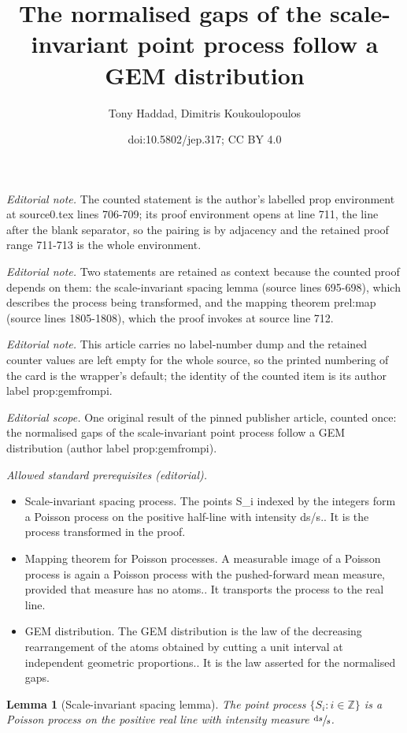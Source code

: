 \documentclass[10pt,a4paper]{article}
\title{The normalised gaps of the scale-invariant point process follow a GEM distribution}
\author{Tony Haddad, Dimitris Koukoulopoulos}
\date{doi:10.5802/jep.317; CC BY 4.0}
\newcommand{\ZZ}{\mathbb{Z}}
\theoremstyle{plain}
\newtheorem{lem}[cor]{Lemma}
\theoremstyle{definition}
\begin{document}
\maketitle
\noindent\textit{Editorial note.} The counted statement is the author's labelled prop environment at source0.tex lines 706-709; its proof environment opens at line 711, the line after the blank separator, so the pairing is by adjacency and the retained proof range 711-713 is the whole environment.\par\medskip
\noindent\textit{Editorial note.} Two statements are retained as context because the counted proof depends on them: the scale-invariant spacing lemma (source lines 695-698), which describes the process being transformed, and the mapping theorem prel:map (source lines 1805-1808), which the proof invokes at source line 712.\par\medskip
\noindent\textit{Editorial note.} This article carries no label-number dump and the retained counter values are left empty for the whole source, so the printed numbering of the card is the wrapper's default; the identity of the counted item is its author label prop:gemfrompi.\par\medskip
\noindent\textit{Editorial scope.} One original result of the pinned publisher article, counted once: the normalised gaps of the scale-invariant point process follow a GEM distribution (author label prop:gemfrompi).\par\medskip
\noindent\textit{Allowed standard prerequisites (editorial).}\begin{itemize}
\item Scale-invariant spacing process. The points S\_i indexed by the integers form a Poisson process on the positive half-line with intensity ds/s.. It is the process transformed in the proof.
\item Mapping theorem for Poisson processes. A measurable image of a Poisson process is again a Poisson process with the pushed-forward mean measure, provided that measure has no atoms.. It transports the process to the real line.
\item GEM distribution. The GEM distribution is the law of the decreasing rearrangement of the atoms obtained by cutting a unit interval at independent geometric proportions.. It is the law asserted for the normalised gaps.
\end{itemize}\medskip
\begin{lem}[Scale-invariant spacing lemma]
\label{lem:scale-invariant-spacing-lemma}
The point process $\{S_i : i \in \ZZ\}$ is a Poisson process on the positive real line with intensity measure $\sfrac{\mathrm ds}{s}$.
\end{lem}
\end{document}
